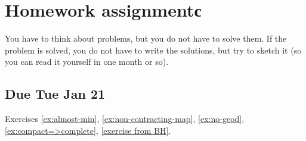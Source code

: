 \addtocounter{chapter}{-1}
\chapter{Homework assignmentс}

You have to think about problems, but you do not have to solve them.
If the problem is solved, you do not have to write the solutions, but try to sketch it (so you can read it yourself in one month or so).

\section{Due Tue Jan 21}

Exercises \ref{ex:almost-min}, \ref{ex:non-contracting-map}, \ref{ex:no-geod}, \ref{ex:compact=>complete}, \ref{exercise from BH}.
